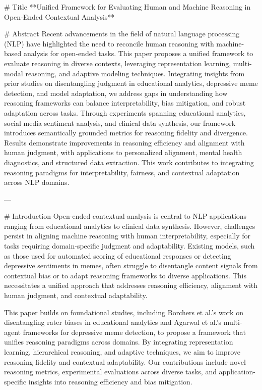 # Title  
**Unified Framework for Evaluating Human and Machine Reasoning in Open-Ended Contextual Analysis**

# Abstract  
Recent advancements in the field of natural language processing (NLP) have highlighted the need to reconcile human reasoning with machine-based analysis for open-ended tasks. This paper proposes a unified framework to evaluate reasoning in diverse contexts, leveraging representation learning, multi-modal reasoning, and adaptive modeling techniques. Integrating insights from prior studies on disentangling judgment in educational analytics, depressive meme detection, and model adaptation, we address gaps in understanding how reasoning frameworks can balance interpretability, bias mitigation, and robust adaptation across tasks. Through experiments spanning educational analytics, social media sentiment analysis, and clinical data synthesis, our framework introduces semantically grounded metrics for reasoning fidelity and divergence. Results demonstrate improvements in reasoning efficiency and alignment with human judgment, with applications to personalized alignment, mental health diagnostics, and structured data extraction. This work contributes to integrating reasoning paradigms for interpretability, fairness, and contextual adaptation across NLP domains.  

---

# Introduction  
Open-ended contextual analysis is central to NLP applications ranging from educational analytics to clinical data synthesis. However, challenges persist in aligning machine reasoning with human interpretability, especially for tasks requiring domain-specific judgment and adaptability. Existing models, such as those used for automated scoring of educational responses or detecting depressive sentiments in memes, often struggle to disentangle content signals from contextual bias or to adapt reasoning frameworks to diverse applications. This necessitates a unified approach that addresses reasoning efficiency, alignment with human judgment, and contextual adaptability.

This paper builds on foundational studies, including Borchers et al.'s work on disentangling rater biases in educational analytics and Agarwal et al.'s multi-agent frameworks for depressive meme detection, to propose a framework that unifies reasoning paradigms across domains. By integrating representation learning, hierarchical reasoning, and adaptive techniques, we aim to improve reasoning fidelity and contextual adaptability. Our contributions include novel reasoning metrics, experimental evaluations across diverse tasks, and application-specific insights into reasoning efficiency and bias mitigation.


